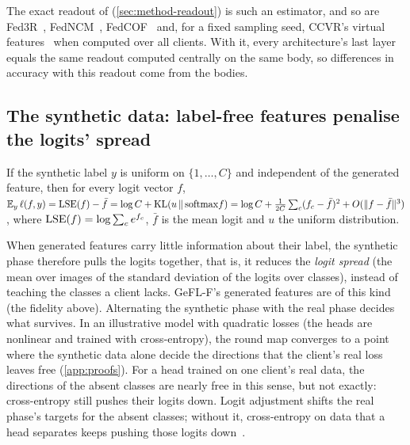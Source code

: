 The exact readout of \ours (\cref{sec:method-readout}) is such an estimator, and so are
Fed3R~\cite{fani2024fed3r}, FedNCM~\cite{legate2023fedncm}, FedCOF~\cite{goswami2025fedcof} and, for a fixed sampling
seed, CCVR's virtual features~\cite{luo2021ccvr} when computed over all clients. With it, every architecture's last
layer equals the same readout computed centrally on the same body, so differences in accuracy with this readout come
from the bodies. 

\subsection{The synthetic data: label-free features penalise the logits' spread}\label{sec:analysis-syn}

\begin{lemma}\label{prop:variance}
If the synthetic label $y$ is uniform on $\{1,\dots,C\}$ and independent of the generated feature, then for every logit
vector $f$, $\mathbb{E}_y\,\ell(f,y)=\mathrm{LSE}(f)-\bar f=\log C+\mathrm{KL}(u\,\|\,\mathrm{softmax}f)
=\log C+\frac1{2C}\sum_c(f_c-\bar f)^2+O(\|f-\bar f\|^3)$, where $\mathrm{LSE}(f)=\log\sum_c e^{f_c}$, $\bar f$ is the mean logit and $u$ the uniform
distribution.
\end{lemma}

When generated features carry little information about their label, the synthetic phase therefore pulls the logits
together, that is, it reduces the \emph{logit spread} (the mean over images of the standard deviation of the logits
over classes), instead of teaching the classes a client lacks. GeFL-F's generated features are of this kind (the
fidelity above). Alternating the synthetic phase with the real phase decides what survives. In an illustrative model
with quadratic losses (the heads are nonlinear and trained with cross-entropy), the round map converges to a point where the synthetic data alone decide the directions that the client's real loss leaves free
(\cref{app:proofs}). For a head trained on one client's real data, the directions of the absent classes are nearly
free in this sense, but not exactly: cross-entropy still pushes their logits down. Logit
adjustment shifts the real phase's targets for the absent classes; without it, cross-entropy on data that a head
separates keeps pushing those logits down~\cite{soudry2018implicit}.

